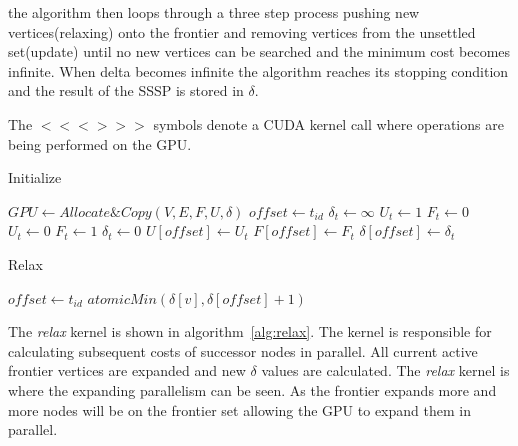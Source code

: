 \documentclass[conference]{IEEEtran}
\begin{document}
the algorithm then loops through a three step process pushing new vertices(relaxing) onto the frontier and removing vertices from the unsettled set(update) until no new vertices can be searched and the minimum cost becomes infinite. When delta becomes infinite the algorithm reaches its stopping condition and the result of the SSSP is stored in $\delta$.

The $<<<>>>$ symbols denote a CUDA kernel call where operations are being performed on the GPU.
\begin{algorithm}
\caption{Initialize}
\label{alg:initialize}
  \begin{algorithmic}[1]
    \STATE $GPU \leftarrow Allocate \& Copy(V, E, F, U, \delta)$
    \STATE $offset \leftarrow t_{id}$
    \STATE $\delta _{t} \leftarrow \infty$
    \STATE $U_{t} \leftarrow 1$
    \STATE $F_{t} \leftarrow 0$
      \STATE $U_{t} \leftarrow 0$
      \STATE $F_{t} \leftarrow 1$
      \STATE $\delta _{t} \leftarrow 0$
    \ENDIF
    \STATE $U[offset] \leftarrow U_{t}$
    \STATE $F[offset] \leftarrow F_{t}$
    \STATE $\delta [offset] \leftarrow \delta _{t}$
  \end{algorithmic}
\end{algorithm}

\begin{algorithm}
\caption{Relax}
\label{alg:relax}
  \begin{algorithmic}[1]
    \STATE $offset \leftarrow t_{id}$
          \STATE $atomicMin(\delta[v], \delta[offset] + 1)$
        \ENDIF
      \ENDFOR
    \ENDIF
  \end{algorithmic}
\end{algorithm}
The \emph{relax} kernel is shown in algorithm~\ref{alg:relax}. The kernel is responsible for calculating subsequent costs of successor nodes in parallel. All current active frontier vertices are expanded and new $\delta$ values are calculated. The \emph{relax} kernel is where the expanding parallelism can be seen. As the frontier expands more and more nodes will be on the frontier set allowing the GPU to expand them in parallel.
\end{document}
